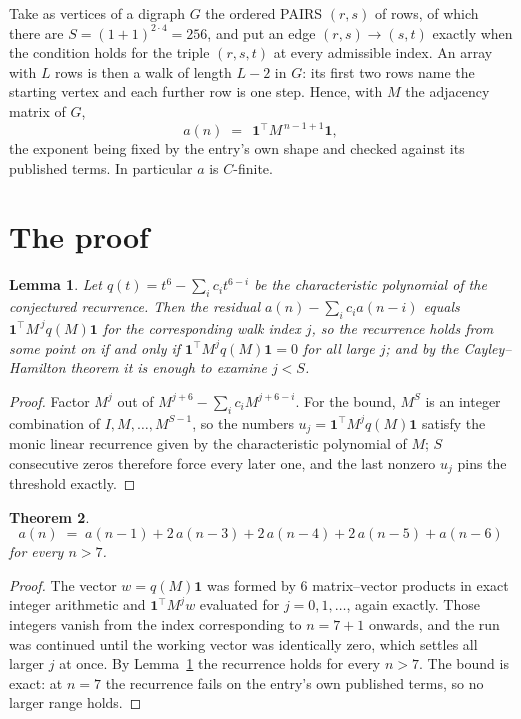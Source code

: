 \documentclass[11pt,a4paper]{article}
\theoremstyle{plain}
\newtheorem{theorem}{Theorem}
\newtheorem{lemma}[theorem]{Lemma}
\theoremstyle{definition}
\begin{document}
Take as vertices of a digraph $G$ the ordered PAIRS $(r,s)$ of rows, of which there are
$S=(1+1)^{2\cdot4}=256$, and put an edge $(r,s)\to(s,t)$ exactly when the condition
holds for the triple $(r,s,t)$ at every admissible index. An array with $L$ rows is then a
walk of length $L-2$ in $G$: its first two rows name the starting vertex and each further
row is one step. Hence, with $M$ the adjacency matrix of $G$,
\[
a(n)\;=\;\,\mathbf{1}^{\!\top}M^{\,n-1+1}\mathbf{1},
\]
the exponent being fixed by the entry's own shape and checked against its published terms.
In particular $a$ is $C$-finite.

\section{The proof}

\begin{lemma}\label{lem:crit}
Let $q(t)=t^{6}-\sum_i c_it^{6-i}$ be the characteristic polynomial of the
conjectured recurrence. Then the residual $a(n)-\sum_ic_ia(n-i)$ equals
$\mathbf{1}^{\!\top}M^{\,j}q(M)\mathbf{1}$ for the corresponding walk index
$j$, so the recurrence holds from some point on if and only if
$\mathbf{1}^{\!\top}M^{j}q(M)\mathbf{1}=0$ for all large $j$; and by the
Cayley--Hamilton theorem it is enough to examine $j<S$.
\end{lemma}

\begin{proof}
Factor $M^{j}$ out of $M^{j+6}-\sum_ic_iM^{j+6-i}$. For the bound, $M^{S}$
is an integer combination of $I,M,\dots,M^{S-1}$, so the numbers
$u_j=\mathbf{1}^{\!\top}M^{j}q(M)\mathbf{1}$ satisfy the monic linear recurrence given by
the characteristic polynomial of $M$; $S$ consecutive zeros therefore force every later one,
and the last nonzero $u_j$ pins the threshold exactly.
\end{proof}

\begin{theorem}
\[
a(n)\;=\;a(n-1) + 2\,a(n-3) + 2\,a(n-4) + 2\,a(n-5) + a(n-6)
\]
for every $n>7$.
\end{theorem}

\begin{proof}
The vector $w=q(M)\mathbf{1}$ was formed by $6$ matrix--vector products in exact
integer arithmetic and $\mathbf{1}^{\!\top}M^{j}w$ evaluated for $j=0,1,\dots$, again
exactly. Those integers vanish from the index corresponding to $n=7+1$ onwards, and the
run was continued until the working vector was identically zero, which settles all larger $j$
at once. By Lemma~\ref{lem:crit} the recurrence holds for every $n>7$. The bound is exact: at $n=7$ the recurrence fails on the entry's own published terms, so no larger range holds.
\end{proof}
\end{document}
